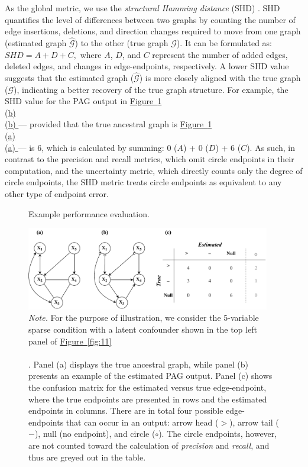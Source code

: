 \documentclass[twoside, 11pt]{article}
\newcommand*{\figref}[2][]{%
  \hyperref[{fig:#2}]{%
    Figure~\ref*{fig:#2}%
    \ifx\\#1\\%
    \else
      #1%
    \fi
  }%
}
\begin{document}
As the global metric, we use the \textit{structural Hamming distance} (SHD) \citep{de2009comparison}. SHD quantifies the level of differences between two graphs by counting the number of edge insertions, deletions, and direction changes required to move from one graph (estimated graph $\hat{\mathcal{G}}$) to the other (true graph $\mathcal{G}$). It can be formulated as:
$\textit{SHD} = A + D + C,$
where $A$, $D$, and $C$ represent the number of added edges, deleted edges, and changes in edge-endpoints, respectively. A lower SHD value suggests that the estimated graph ($\hat{\mathcal{G}}$) is more closely aligned with the true graph ($\mathcal{G}$), indicating a better recovery of the true graph structure. For example, the SHD value for the PAG output in \figref[(b)]{12} --- provided that the true ancestral graph is \figref[(a)]{12} --- is 6, which is calculated by summing: 0 ($A$) + 0 ($D$) + 6 ($C$). As such, in contrast to the precision and recall metrics, which omit circle endpoints in their computation, and the uncertainty metric, which directly counts only the degree of circle endpoints, the SHD metric treats circle endpoints as equivalent to any other type of endpoint error.


\begin{figure}[!t]
    \centering
        \caption{Example performance evaluation.}
        \vspace{1mm}
        \includegraphics[width=0.95\textwidth]{figures/Fig13.pdf}
        \vspace*{2mm}
        \caption*{\small{\textit{Note.} 
        For the purpose of illustration, we consider the 5-variable sparse condition with a latent confounder shown in the top left panel of \figref[]{11}. Panel (a) displays the true ancestral graph, while panel (b) presents an example of the estimated PAG output. Panel (c) shows the confusion matrix for the estimated versus true edge-endpoint, where the true endpoints are presented in rows and the estimated endpoints in columns. There are in total four possible edge-endpoints that can occur in an output: arrow head ($>$), arrow tail ($-$), null (no endpoint), and circle ($\circ$). The circle endpoints, however, are not counted toward the calculation of \textit{precision} and \textit{recall}, and thus are greyed out in the table.}}
    \label{fig:12}
\end{figure}
\end{document}
